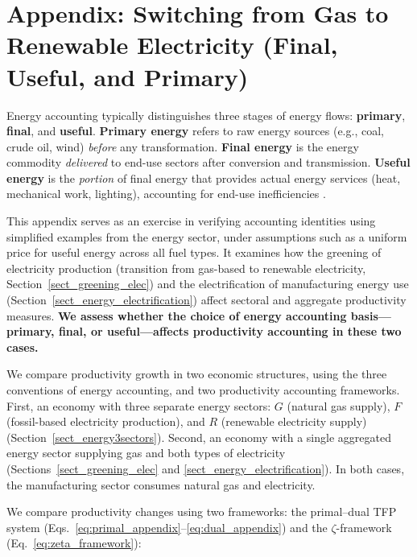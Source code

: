 \documentclass[11pt]{article}
\begin{document}
\section{Appendix: Switching from Gas to Renewable Electricity (Final, Useful, and Primary)}
\label{appendix_gas_renewables}

Energy accounting typically distinguishes three stages of energy flows: \textbf{primary}, \textbf{final}, and \textbf{useful}. \textbf{Primary energy} refers to raw energy sources (e.g., coal, crude oil, wind) \emph{before} any transformation. \textbf{Final energy} is the energy commodity \emph{delivered} to end-use sectors after conversion and transmission. \textbf{Useful energy} is the \emph{portion} of final energy that provides actual energy services (heat, mechanical work, lighting), accounting for end-use inefficiencies \citep{wayEmpiricallyGroundedTechnology2022}.

\vspace{3mm}
This appendix serves as an exercise in verifying accounting identities using simplified examples from the energy sector, under assumptions such as a uniform price for useful energy across all fuel types. It examines how the greening of electricity production (transition from gas-based to renewable electricity, Section~\ref{sect_greening_elec}) and the electrification of manufacturing energy use (Section~\ref{sect_energy_electrification}) affect sectoral and aggregate productivity measures.  
\textbf{We assess whether the choice of energy accounting basis—primary, final, or useful—affects productivity accounting in these two cases.}

\vspace{3mm}

We compare productivity growth in two economic structures, using the three conventions of energy accounting, and two productivity accounting frameworks.
First, an economy with three separate energy sectors: $G$ (natural gas supply), $F$ (fossil-based electricity production), and $R$ (renewable electricity supply) (Section~\ref{sect_energy3sectors}). Second, an economy with a single aggregated energy sector supplying gas and both types of electricity (Sections~\ref{sect_greening_elec} and \ref{sect_energy_electrification}). In both cases, the manufacturing sector consumes natural gas and electricity.

We compare productivity changes using two frameworks: the primal--dual TFP system (Eqs.~\eqref{eq:primal_appendix}--\eqref{eq:dual_appendix}) and the $\zeta$-framework (Eq.~\eqref{eq:zeta_framework}):
\end{document}

